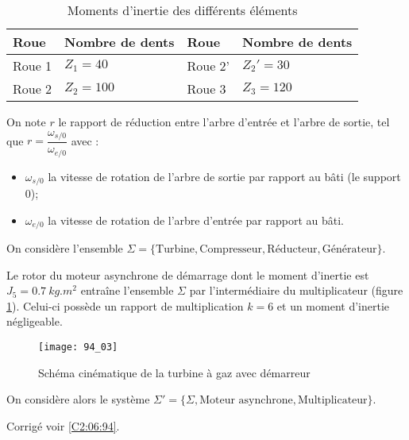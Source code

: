 \begin{table}[!h]
\begin{tabular}{llll}
\hline
Roue & Nombre de dents & Roue & Nombre de dents\\ \hline
Roue 1 		& $Z_1 = 40$ 	& Roue 2' 	& $Z_2' = 30$ 	\\
Roue 2 		& $Z_2 = 100$ 	& Roue 3	& $Z_3 = 120$ 	\\
 \hline
\end{tabular}
\caption{Moments d’inertie des différents éléments \label{tab_94_02}}
 \end{table}

 On note $r$ le rapport de réduction entre l’arbre d’entrée et l’arbre de sortie, tel que $r = \dfrac{\omega_{s/0}}{\omega_{e/0}}$ avec :
\begin{itemize}
 	\item  $\omega_{s/0}$ la vitesse de rotation de l’arbre de sortie par rapport au bâti (le support 0);
 	\item $\omega_{e/0}$ la vitesse de rotation de l’arbre d'entrée par rapport au bâti.
\end{itemize}

\fi


\ifprof
\else
\fi

On considère l’ensemble $\Sigma =\{\text{Turbine}, \text{Compresseur}, \text{Réducteur}, \text{Générateur}\}$.

\ifprof 
\else
\fi

Le rotor du moteur asynchrone de démarrage dont le moment d’inertie est $J_5=\SI{0,7}{kg.m^2}$ entraîne
 l’ensemble $\Sigma$ par l’intermédiaire du multiplicateur (figure \ref{fig_94_03}). Celui-ci possède un rapport de multiplication $k=6$ et un moment d’inertie négligeable.
 
 \begin{figure}[!h]
\texttt{[image: 94\_03]}
\caption{Schéma cinématique de la turbine à gaz avec démarreur \label{fig_94_03}}
\end{figure}

On considère alors le système $\Sigma' = \{ \Sigma, \text{Moteur asynchrone}, \text{Multiplicateur}\}$.
 
 

 

\ifprof
\else
\begin{flushright}
\footnotesize{Corrigé  voir \ref{C2:06:94}.}
\end{flushright}%
\fi